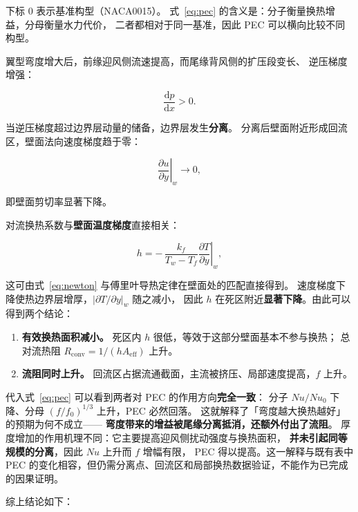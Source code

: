 \documentclass[stage2,fontset=fandol]{ydzjreport}
\begin{document}
下标 0 表示基准构型（NACA0015）。
式~\eqref{eq:pec} 的含义是：分子衡量换热增益，分母衡量水力代价，
二者都相对于同一基准，因此 PEC 可以横向比较不同构型。

翼型弯度增大后，前缘迎风侧流速提高，而尾缘背风侧的扩压段变长、
逆压梯度增强：

\begin{equation}
\frac{\mathrm{d}p}{\mathrm{d}x} > 0 .
\label{eq:adverse}
\end{equation}

当逆压梯度超过边界层动量的储备，边界层发生\textbf{分离}。
分离后壁面附近形成回流区，壁面法向速度梯度趋于零：

\begin{equation}
\left.\frac{\partial u}{\partial y}\right|_{w} \rightarrow 0 ,
\label{eq:shear}
\end{equation}

即壁面剪切率显著下降。

对流换热系数与\textbf{壁面温度梯度}直接相关：

\begin{equation}
h = -\,\frac{k_f}{T_w - T_f}\left.\frac{\partial T}{\partial y}\right|_{w},
\label{eq:hgrad}
\end{equation}

这可由式~\eqref{eq:newton} 与傅里叶导热定律在壁面处的匹配直接得到。
速度梯度下降使热边界层增厚，$\left|\partial T/\partial y\right|_w$ 随之减小，
因此 $h$ 在死区附近\textbf{显著下降}。由此可以得到两个结论：

\begin{enumerate}
  \item \textbf{有效换热面积减小。}
  死区内 $h$ 很低，等效于这部分壁面基本不参与换热；
  总对流热阻
  $R_{\mathrm{conv}} = 1/(hA_{\mathrm{eff}})$ 上升。
  \item \textbf{流阻同时上升。}
  回流区占据流通截面，主流被挤压、局部速度提高，$f$ 上升。
\end{enumerate}

代入式~\eqref{eq:pec} 可以看到两者对 PEC 的作用方向\textbf{完全一致}：
分子 $Nu/Nu_0$ 下降、分母 $(f/f_0)^{1/3}$ 上升，PEC 必然回落。
这就解释了「弯度越大换热越好」的预期为何不成立——
\textbf{弯度带来的增益被尾缘分离抵消，还额外付出了流阻}。
厚度增加的作用机理不同：它主要提高迎风侧扰动强度与换热面积，
\textbf{并未引起同等规模的分离}，因此 $Nu$ 上升而 $f$ 增幅有限，
PEC 得以提高。这一解释与既有表中 PEC 的变化相容，但仍需分离点、回流区和局部换热数据验证，不能作为已完成的因果证明。

综上结论如下：
\end{document}
